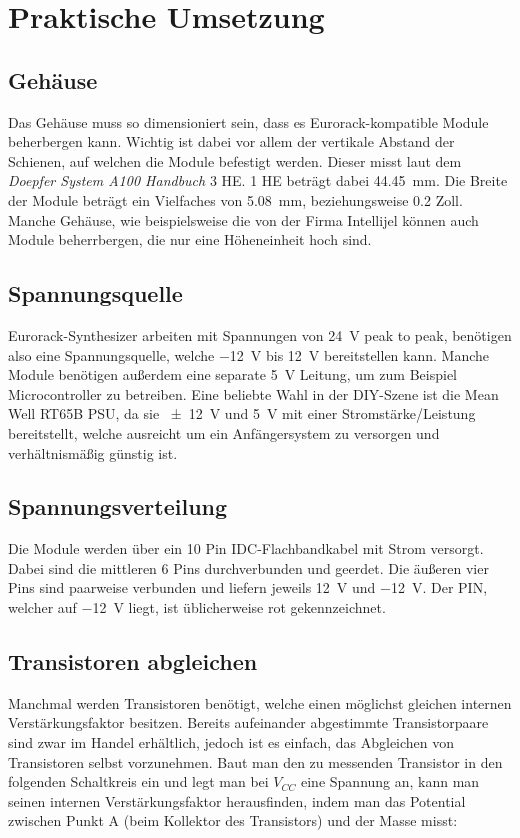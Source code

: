 \chapter{Praktische Umsetzung}

\section{Gehäuse}
\label{sec:org2941e49}
Das Gehäuse muss so dimensioniert sein, dass es Eurorack-kompatible Module beherbergen kann. Wichtig ist dabei vor allem der vertikale Abstand der Schienen, auf welchen die Module befestigt werden. Dieser misst laut dem \emph{Doepfer System A100 Handbuch} \cite{doepfer:A-100} 3 \ac{HE}. 1 \ac{HE} beträgt dabei \SI{44.45}{\milli\meter}. Die Breite der Module beträgt ein Vielfaches von \SI{5.08}{\milli\meter}, beziehungsweise 0.2 Zoll. Manche Gehäuse, wie beispielsweise die von der Firma Intellijel können auch Module beherrbergen, die nur eine Höheneinheit hoch sind.

\section{Spannungsquelle}
\label{sec:orgb11a6fc}
Eurorack-Synthesizer arbeiten mit Spannungen von \SI{24}{\volt} peak to peak, benötigen also eine Spannungsquelle, welche \SI{-12}{\volt} bis \SI{+12}{\volt} bereitstellen kann. Manche Module benötigen außerdem eine separate \SI{5}{\volt} Leitung, um zum Beispiel Microcontroller zu betreiben. Eine beliebte Wahl in der DIY-Szene ist die Mean Well RT65B PSU, da sie \SI{\pm 12}{\volt} und \SI{5}{\volt} mit einer Stromstärke/Leistung bereitstellt, welche ausreicht um ein Anfängersystem zu versorgen und verhältnismäßig günstig ist.

\section{Spannungsverteilung}
\label{sec:orgef8e379}
Die Module werden über ein 10 Pin IDC-Flachbandkabel mit Strom versorgt. Dabei sind die mittleren 6 Pins durchverbunden und geerdet. Die äußeren vier Pins sind paarweise verbunden und liefern jeweils \SI{+12}{\volt} und \SI{-12}{\volt}. Der PIN, welcher auf \SI{-12}{\volt} liegt, ist üblicherweise rot gekennzeichnet.

\section{Transistoren abgleichen}
\label{sec:org53eaa72}
Manchmal werden Transistoren benötigt, welche einen möglichst gleichen internen Verstärkungsfaktor besitzen. Bereits aufeinander abgestimmte Transistorpaare sind zwar im Handel erhältlich, jedoch ist es einfach, das Abgleichen von Transistoren selbst vorzunehmen. Baut man den zu messenden Transistor in den folgenden Schaltkreis ein und legt man bei \(V_{CC}\) eine Spannung an, kann man seinen internen Verstärkungsfaktor herausfinden, indem man das Potential zwischen Punkt A (beim Kollektor des Transistors) und der Masse misst:

